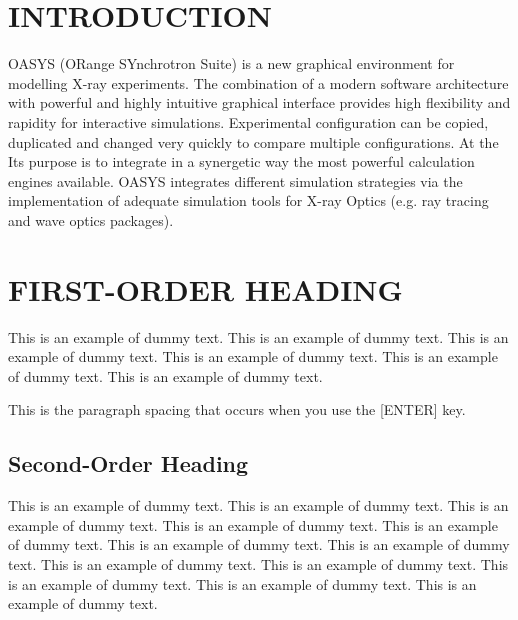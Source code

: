 \documentclass{aip-cp}
\begin{document}
\section{INTRODUCTION}

OASYS (ORange SYnchrotron Suite) is a new graphical environment for modelling X-ray experiments. The combination of a modern  software architecture with powerful and highly intuitive graphical interface provides high flexibility and rapidity for interactive simulations. Experimental configuration can be copied, duplicated and changed very quickly to compare multiple configurations. At the Its purpose is to integrate in a synergetic way the most powerful calculation engines available. OASYS integrates different simulation strategies via the implementation of adequate simulation tools for X-ray Optics (e.g. ray tracing and wave optics packages). 


\section{FIRST-ORDER HEADING}
This is an example of dummy text. This is an example of dummy text. This is an example of dummy text.
This is an example of dummy text. This is an example of dummy text. This is an example of dummy text.

This is the paragraph spacing that occurs when you use the [ENTER] key.

\subsection{Second-Order Heading}
This is an example of dummy text. This is an example of dummy text. This is an example of dummy text.
This is an example of dummy text. This is an example of dummy text. This is an example of dummy text.
This is an example of dummy text. This is an example of dummy text. This is an example of dummy text.
This is an example of dummy text. This is an example of dummy text. This is an example of dummy text.


\end{document}
